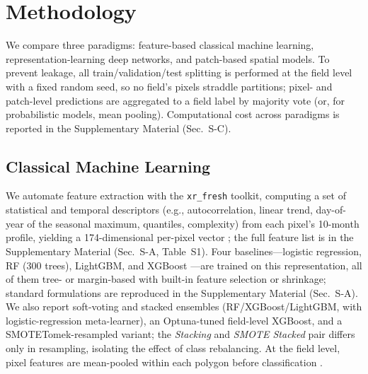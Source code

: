 \documentclass[journal]{IEEEtran}
\begin{document}
\section{Methodology}
We compare three paradigms: feature-based classical machine learning, representation-learning deep networks, and patch-based spatial models. To prevent leakage, all train/validation/test splitting is performed at the field level with a fixed random seed, so no field's pixels straddle partitions; pixel- and patch-level predictions are aggregated to a field label by majority vote (or, for probabilistic models, mean pooling). Computational cost across paradigms is reported in the Supplementary Material (Sec.~S-C).

\subsection{Classical Machine Learning}
We automate feature extraction with the \texttt{xr\_fresh} toolkit, computing a set of statistical and temporal descriptors (e.g., autocorrelation, linear trend, day-of-year of the seasonal maximum, quantiles, complexity) from each pixel's 10-month profile, yielding a 174-dimensional per-pixel vector \cite{mann2023, mann2025}; the full feature list is in the Supplementary Material (Sec.~S-A, Table~S1). Four baselines---logistic regression, RF (300 trees), LightGBM, and XGBoost \cite{james2013, breiman2001, ke2017, chen2016, friedman2001}---are trained on this representation, all of them tree- or margin-based with built-in feature selection or shrinkage; standard formulations are reproduced in the Supplementary Material (Sec.~S-A). We also report soft-voting and stacked ensembles (RF/XGBoost/LightGBM, with logistic-regression meta-learner), an Optuna-tuned field-level XGBoost, and a SMOTETomek-resampled variant; the \emph{Stacking} and \emph{SMOTE Stacked} pair differs only in resampling, isolating the effect of class rebalancing. At the field level, pixel features are mean-pooled within each polygon before classification \cite{penabarragan2011}.
\end{document}
